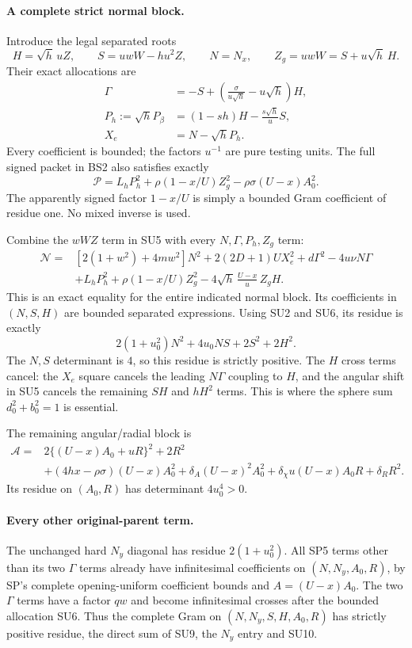 \paragraph{A complete strict normal block.}
Introduce the legal separated roots
\[
 H=\sqrt h\,uZ,\qquad S=uwW-hu^2Z,\qquad N=N_x,
 \qquad Z_g=uwW=S+u\sqrt h\,H.
\]
Their exact allocations are
\[
\begin{split}
 \Gamma&=-S+\left(\frac{\sigma}{u\sqrt h}-u\sqrt h\right)H,\\
 P_h:=\sqrt h P_\beta&=(1-sh)H-\frac{s\sqrt h}{u}S,\\
 X_e&=N-\sqrt h P_h.
\end{split} \tag{SU6}
\]
Every coefficient is bounded; the factors $u^{-1}$ are pure testing
units.  The full signed packet in BS2 also satisfies exactly
\[
 \mathscr P=L_hP_h^2+
      \rho(1-x/U)Z_g^2-\rho\sigma(U-x)A_0^2.
 \tag{SU7}
\]
The apparently signed factor $1-x/U$ is simply a bounded Gram
coefficient of residue one.  No mixed inverse is used.

Combine the $wWZ$ term in SU5 with every $N,\Gamma,P_h,Z_g$ term:
\[
\begin{split}
 \mathscr N={}&[2(1+w^2)+4mw^2]N^2
     +2(2D+1)U X_e^2+d\Gamma^2-4u\nu N\Gamma\\
 &+L_hP_h^2+\rho(1-x/U)Z_g^2
       -4\sqrt h\,\frac{U-x}{u}\,Z_gH .
\end{split} \tag{SU8}
\]
This is an exact equality for the entire indicated normal block.
Its coefficients in $(N,S,H)$ are bounded separated expressions.
Using SU2 and SU6, its residue is exactly
\[
 2(1+u_0^2)N^2+4u_0NS+2S^2+2H^2.
 \tag{SU9}
\]
The $N,S$ determinant is $4$, so this residue is strictly positive.
The $H$ cross terms cancel: the $X_e$ square cancels the leading
$N\Gamma$ coupling to $H$, and the angular shift in SU5 cancels
the remaining $S H$ and $hH^2$ terms.  This is where the sphere
sum $d_0^2+b_0^2=1$ is essential.

The remaining angular/radial block is
\[
\begin{split}
 \mathscr A={}&2\{(U-x)A_0+uR\}^2+2R^2\\
 &+(4hx-\rho\sigma)(U-x)A_0^2
   +\delta_A(U-x)^2A_0^2
   +\delta_\chi u(U-x)A_0R+\delta_RR^2.
\end{split} \tag{SU10}
\]
Its residue on $(A_0,R)$ has determinant $4u_0^4>0$.

\paragraph{Every other original-parent term.}
The unchanged hard $N_y$ diagonal has residue $2(1+u_0^2)$.
All SP5 terms other than its two $\Gamma$ terms already have
infinitesimal coefficients on $(N,N_y,A_0,R)$, by SP's complete
opening-uniform coefficient bounds and $A=(U-x)A_0$.
The two $\Gamma$ terms have a factor $qw$ and become infinitesimal
crosses after the bounded allocation SU6.  Thus the complete Gram
on $(N,N_y,S,H,A_0,R)$ has strictly positive residue, the direct
sum of SU9, the $N_y$ entry and SU10.

